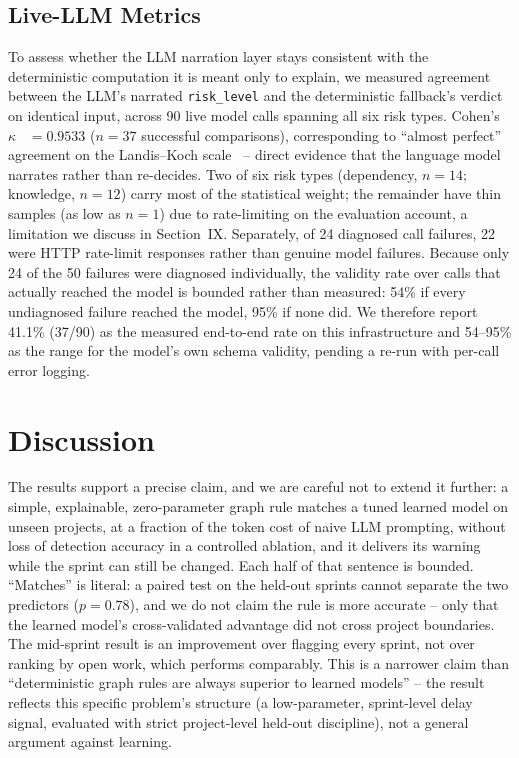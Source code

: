 \documentclass[conference]{IEEEtran}
\begin{document}
\subsection{Live-LLM Metrics}

To assess whether the LLM narration layer stays consistent with the deterministic
computation it is meant only to explain, we measured agreement between the LLM's
narrated \texttt{risk\_level} and the deterministic fallback's verdict on identical
input, across 90 live model calls spanning all six risk types. Cohen's
$\kappa$~\cite{cohen-kappa} $= 0.9533$ ($n=37$ successful comparisons), corresponding
to ``almost perfect'' agreement on the Landis--Koch scale~\cite{landis-koch} --
direct evidence that the language model narrates rather than re-decides. Two of six
risk types (dependency, $n=14$; knowledge, $n=12$) carry most of the statistical
weight; the remainder have thin samples (as low as $n=1$) due to rate-limiting on the
evaluation account, a limitation we discuss in Section~IX. Separately, of 24
diagnosed call failures, 22 were HTTP rate-limit responses rather than genuine model
failures. Because only 24 of the 50 failures were diagnosed individually, the validity
rate over calls that actually reached the model is bounded rather than measured: 54\%
if every undiagnosed failure reached the model, 95\% if none did. We therefore report
41.1\% (37/90) as the measured end-to-end rate on this infrastructure and 54--95\% as
the range for the model's own schema validity, pending a re-run with per-call error
logging.

\section{Discussion}

The results support a precise claim, and we are careful not to extend it further: a
simple, explainable, zero-parameter graph rule matches a tuned learned model on unseen
projects, at a fraction of the token cost of naive LLM prompting, without loss of
detection accuracy in a controlled ablation, and it delivers its warning while the
sprint can still be changed. Each half of that sentence is bounded. ``Matches'' is
literal: a paired test on the held-out sprints cannot separate the two predictors
($p = 0.78$), and we do not claim the rule is more accurate -- only that the learned
model's cross-validated advantage did not cross project boundaries. The mid-sprint
result is an improvement over flagging every sprint, not over ranking by open work,
which performs comparably. This is a narrower claim than ``deterministic graph rules
are always superior to learned models'' -- the result reflects this specific problem's
structure (a low-parameter, sprint-level delay signal, evaluated with strict
project-level held-out discipline), not a general argument against learning.
\end{document}
